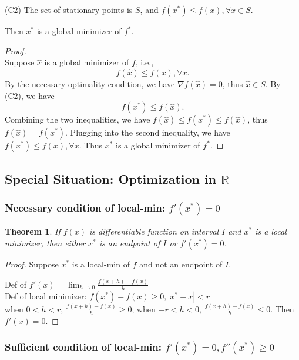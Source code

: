 \documentclass[11pt,a4paper]{article}
\newtheorem{theorem}{Theorem}
\begin{document}
(C2) The set of stationary points is $S$, and $f\left(x^{*}\right) \leq f(x), \forall x \in S$.

Then $x^{*}$ is a global minimizer of $f^{*}$.
\begin{proof}
\quad\\
Suppose $\hat{x}$ is a global minimizer of $f$, i.e.,
$$
f(\hat{x}) \leq f(x), \forall x .
$$
By the necessary optimality condition, we have $\nabla f(\hat{x})=0$, thus $\hat{x} \in S$. By (C2), we have
$$
f\left(x^{*}\right) \leq f(\hat{x}) .
$$
Combining the two inequalities, we have $f(\hat{x}) \leq f\left(x^{*}\right) \leq f(\hat{x})$, thus $f(\hat{x})=f\left(x^{*}\right)$. Plugging into the second inequality, we have $f\left(x^{*}\right) \leq f(x), \forall x$. Thus $x^{*}$ is a global minimizer of $f^{*} .$
\end{proof}

\subsection{Special Situation: Optimization in $\mathbb{R}$}
\subsubsection{ Necessary condition of local-min: $f'(x^*)=0$}

\begin{theorem}
If $f(x)$ is differentiable function on interval $I$ and $x^*$ is a local minimizer, then either $x^*$ is an endpoint of $I$ or $f'(x^*)=0$.
\end{theorem}

\begin{proof}
Suppose $x^*$ is a local-min of $f$ and not an endpoint of $I$.

Def of $f'(x)=\lim_{h \rightarrow 0} \frac{f(x+h)-f(x)}{h}$\\
Def of local minimizer: $f(x^*)-f(x)\geq 0, |x^*-x|<r$\\
when $0<h<r$, $\frac{f(x+h)-f(x)}{h}\geq 0$; when $-r<h<0$, $\frac{f(x+h)-f(x)}{h}\leq 0$. Then $f'(x)=0$.
\end{proof}

\subsubsection{ Sufficient condition of local-min: $f'(x^*)=0, f''(x^*)\geq 0$}
\end{document}
